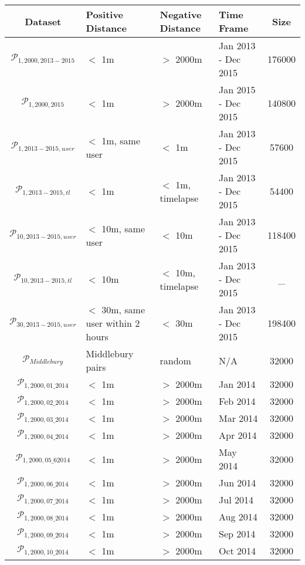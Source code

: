 \begin{table}
	\centering
	\begin{tabular}{c >{\centering\arraybackslash}m{3.2cm} >{\centering\arraybackslash}m{3cm} >{\centering\arraybackslash}m{2cm} c}
		\toprule
		\bfseries{Dataset} &  \bfseries Positive Distance & \bfseries Negative Distance & \bfseries Time Frame & \bfseries{Size}\\
		\midrule
		$\mathcal{P}_{1,2000,2013-2015}$ & $<$ 1m & $>$ 2000m & Jan 2013 - Dec 2015  & 176000\\
		$\mathcal{P}_{1,2000,2015}$ & $<$ 1m & $>$ 2000m & Jan 2015 - Dec 2015  & 140800\\
		$\mathcal{P}_{1,2013-2015,user}$ & $<$ 1m, same user & $<$ 1m & Jan 2013 - Dec 2015  & 57600\\
		$\mathcal{P}_{1,2013-2015,tl}$ & $<$ 1m & $<$ 1m, timelapse & Jan 2013 - Dec 2015  & 54400\\
		$\mathcal{P}_{10,2013-2015,user}$ & $<$ 10m, same user & $<$ 10m & Jan 2013 - Dec 2015  & 118400\\
		$\mathcal{P}_{10,2013-2015,tl}$ & $<$ 10m & $<$ 10m, timelapse & Jan 2013 - Dec 2015  & \_\\
		$\mathcal{P}_{30,2013-2015,user}$ & $<$ 30m, same user within 2 hours & $<$ 30m & Jan 2013 - Dec 2015  & 198400\\
		$\mathcal{P}_{Middlebury}$ & Middlebury pairs & random & N/A & 32000 \\
		$\mathcal{P}_{1,2000,01\_2014}$ & $<$ 1m & $>$ 2000m & Jan 2014  & 32000\\
		$\mathcal{P}_{1,2000,02\_2014}$ & $<$ 1m & $>$ 2000m & Feb 2014  & 32000\\
		$\mathcal{P}_{1,2000,03\_2014}$ & $<$ 1m & $>$ 2000m & Mar 2014 & 32000\\
		$\mathcal{P}_{1,2000,04\_2014}$ & $<$ 1m & $>$ 2000m & Apr 2014  & 32000\\
		$\mathcal{P}_{1,2000,05\_62014}$ & $<$ 1m & $>$ 2000m & May 2014  & 32000\\
		$\mathcal{P}_{1,2000,06\_2014}$ & $<$ 1m & $>$ 2000m & Jun 2014  & 32000\\
		$\mathcal{P}_{1,2000,07\_2014}$ & $<$ 1m & $>$ 2000m & Jul 2014  & 32000\\
		$\mathcal{P}_{1,2000,08\_2014}$ & $<$ 1m & $>$ 2000m & Aug 2014  & 32000\\
		$\mathcal{P}_{1,2000,09\_2014}$ & $<$ 1m & $>$ 2000m & Sep 2014  & 32000\\
		$\mathcal{P}_{1,2000,10\_2014}$ & $<$ 1m & $>$ 2000m & Oct 2014  & 32000\\

\end{tabular}
\end{table}
